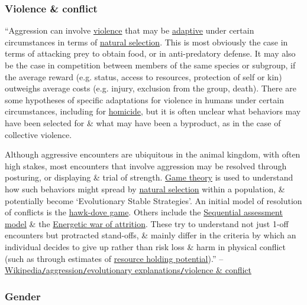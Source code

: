 \documentclass[oneside]{book}
\numberwithin{equation}{section}
\begin{document}
\subsubsection{Violence \& conflict}
``Aggression can involve \href{https://en.wikipedia.org/wiki/Violence}{violence} that may be \href{https://en.wikipedia.org/wiki/Adaptation}{adaptive} under certain circumstances in terms of \href{https://en.wikipedia.org/wiki/Natural_selection}{natural selection}. This is most obviously the case in terms of attacking prey to obtain food, or in anti-predatory defense. It may also be the case in competition between members of the same species or subgroup, if the average reward (e.g. status, access to resources, protection of self or kin) outweighs average costs (e.g. injury, exclusion from the group, death). There are some hypotheses of specific adaptations for violence in humans under certain circumstances, including for \href{https://en.wikipedia.org/wiki/Homicide}{homicide}, but it is often unclear what behaviors may have been selected for \& what may have been a byproduct, as in the case of collective violence.

Although aggressive encounters are ubiquitous in the animal kingdom, with often high stakes, most encounters that involve aggression may be resolved through posturing, or displaying \& trial of strength. \href{https://en.wikipedia.org/wiki/Game_theory}{Game theory} is used to understand how such behaviors might spread by \href{https://en.wikipedia.org/wiki/Natural_selection}{natural selection} within a population, \& potentially become `Evolutionary Stable Strategies'. An initial model of resolution of conflicts is the \href{https://en.wikipedia.org/wiki/Hawk-dove_game}{hawk-dove game}. Others include the \href{https://en.wikipedia.org/wiki/Risk_management}{Sequential assessment model} \& the \href{https://en.wikipedia.org/wiki/Attrition_warfare}{Energetic war of attrition}. These try to understand not just 1-off encounters but protracted stand-offs, \& mainly differ in the criteria by which an individual decides to give up rather than risk loss \& harm in physical conflict (such as through estimates of \href{https://en.wikipedia.org/wiki/Resource_holding_potential}{resource holding potential}).'' -- \href{https://en.wikipedia.org/wiki/Aggression#Violence_and_conflict}{Wikipedia\texttt{/}aggression\texttt{/}evolutionary explanations\texttt{/}violence \& conflict}

\subsubsection{Gender}
\end{document}

